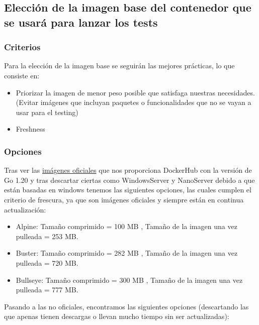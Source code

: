 \subsection{Elección de la imagen base del contenedor que se usará para lanzar los tests}

\subsubsection{Criterios}

Para la elección de la imagen base se seguirán las mejores prácticas, lo
que consiste en:

\begin{itemize}
\item
  Priorizar la imagen de menor peso posible que satisfaga nuestras
  necesidades. (Evitar imágenes que incluyan paquetes o funcionalidades
  que no se vayan a usar para el testing)
\item
  Freshness
\end{itemize}

\subsubsection{Opciones}

Tras ver las \href{https://hub.docker.com/_/golang}{imágenes oficiales} \cite{dockerhub}
que nos proporciona DockerHub con la versión de Go 1.20 y tras descartar
ciertas como WindowsServer y NanoServer debido a que están basadas en
windows tenemos las siguientes opciones, las cuales cumplen el criterio
de frescura, ya que son imágenes oficiales y siempre están en continua
actualización:

\begin{itemize}
\item
  Alpine: Tamaño comprimido = 100 MB , Tamaño de la imagen una vez
  pulleada = 253 MB.
\item
  Buster: Tamaño comprimido = 282 MB , Tamaño de la imagen una vez
  pulleada = 720 MB.
\item
  Bullseye: Tamaño comprimido = 300 MB , Tamaño de la imagen una vez
  pulleada = 777 MB.
\end{itemize}

Pasando a las no oficiales, encontramos las siguientes opciones
(descartando las que apenas tienen descargas o llevan mucho tiempo sin
ser actualizadas):

